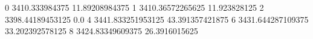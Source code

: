 0 3410.333984375 11.89208984375
1 3410.36572265625 11.923828125
2 3398.44189453125 0.0
4 3441.833251953125 43.391357421875
6 3431.644287109375 33.202392578125
8 3424.83349609375 26.3916015625

